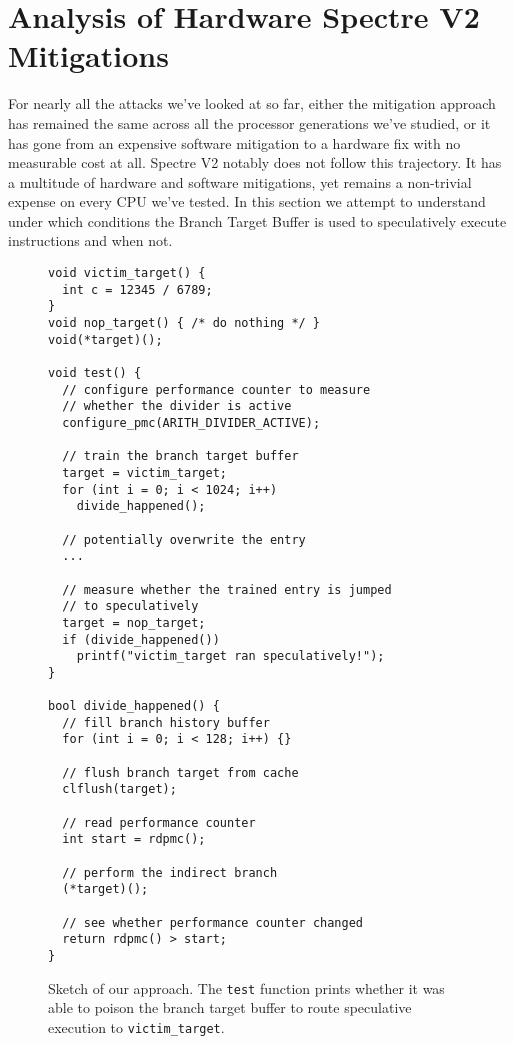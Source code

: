 \section{Analysis of Hardware Spectre V2 Mitigations}
\label{s:analysis}

For nearly all the attacks we've looked at so far, either the mitigation approach has remained the same across all the processor generations we've studied, or it has gone from an expensive software mitigation to a hardware fix with no measurable cost at all.
Spectre V2 notably does not follow this trajectory.
It has a multitude of hardware and software mitigations, yet remains a non-trivial expense on every CPU we've tested.
In this section we attempt to understand under which conditions the
Branch Target Buffer is used to speculatively execute instructions and when not.

\begin{figure}[!ht]
\begin{lstlisting}
void victim_target() {
  int c = 12345 / 6789;
}
void nop_target() { /* do nothing */ }
void(*target)();

void test() {
  // configure performance counter to measure
  // whether the divider is active
  configure_pmc(ARITH_DIVIDER_ACTIVE);

  // train the branch target buffer
  target = victim_target;
  for (int i = 0; i < 1024; i++)
    divide_happened();

  // potentially overwrite the entry
  ...

  // measure whether the trained entry is jumped
  // to speculatively
  target = nop_target;
  if (divide_happened())
    printf("victim_target ran speculatively!");
}

bool divide_happened() {
  // fill branch history buffer
  for (int i = 0; i < 128; i++) {}

  // flush branch target from cache
  clflush(target);

  // read performance counter
  int start = rdpmc();

  // perform the indirect branch
  (*target)();

  // see whether performance counter changed
  return rdpmc() > start;
}\end{lstlisting}
\caption{Sketch of our approach. The \texttt{test} function prints whether it was able to poison the branch target buffer to route speculative execution to \texttt{victim\_target}.}
\label{fig:spectre2-sample}
\end{figure}
\vfill
\clearpage

